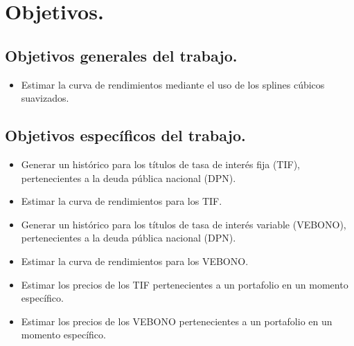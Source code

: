 \newpage

\section{Objetivos.}

\subsection{Objetivos  generales del trabajo.}

\begin{itemize}
  \item Estimar la curva de rendimientos mediante el uso de los splines c\'ubicos suavizados.
\end{itemize}

\subsection{Objetivos espec\'ificos del trabajo.}

\begin{itemize}
  \item Generar un hist\'orico para los t\'itulos de tasa de inter\'es fija (TIF), pertenecientes a la deuda p\'ublica nacional (DPN).
  \item Estimar la curva de rendimientos para los TIF.
  \item Generar un hist\'orico para los t\'itulos de tasa de inter\'es variable (VEBONO), pertenecientes a la deuda p\'ublica nacional (DPN).
  \item Estimar la curva de rendimientos para los VEBONO.
  \item Estimar los precios de los TIF pertenecientes a un portafolio en un momento espec\'ifico.
  \item Estimar los precios de los VEBONO pertenecientes a un portafolio en un momento espec\'ifico.

\end{itemize}



